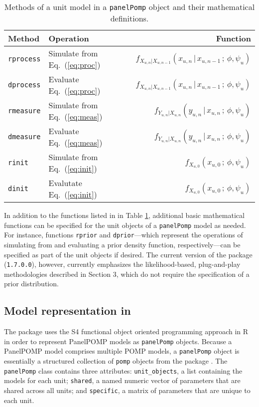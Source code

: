 \begin{table}[ht]
\begin{center}
\begin{tabular}{llr}\hline
Method            & Operation & Function\\\hline
\texttt{rprocess} & Simulate from Eq.~(\ref{eq:proc}) & $f_{X_{u,n}\vert X_{u,n-1}}(x_{u,n}\,|\, x_{u,n-1} \,;\, \phi,\psi_u)$\\
\texttt{dprocess} & Evaluate Eq.~(\ref{eq:proc}) & $f_{X_{u,n}\vert X_{u,n-1}}(x_{u,n}\,|\, x_{u,n-1} \,;\, \phi,\psi_u)$\\
\texttt{rmeasure} & Simulate from Eq.~(\ref{eq:meas}) & $f_{Y_{u,n}|X_{u,n}}(y_{u,n}\,|\, x_{u,n} \,;\, \phi,\psi_u)$\\
\texttt{dmeasure} & Evaluate Eq.~(\ref{eq:meas}) & $f_{Y_{u,n}|X_{u,n}}(y_{u,n}\,|\, x_{u,n} \,;\, \phi,\psi_u)$\\
\texttt{rinit}   & Simulate from Eq.~(\ref{eq:init}) & $f_{X_{u,0}}(x_{u,0} \,;\, \phi,\psi_u)$\\
\texttt{dinit}   & Evalutate Eq.~(\ref{eq:init}) & $f_{X_{u,0}}(x_{u,0} \,;\, \phi,\psi_u)$\\\hline
\end{tabular}
\end{center}
\caption{\label{tab:funs}Methods of a unit model in a \texttt{panelPomp} object and their mathematical definitions.}
\end{table}

In addition to the functions listed in in Table \ref{tab:funs}, additional basic mathematical functions can be specified for the unit objects of a \texttt{panelPomp} model as needed.
For instance, functions \texttt{rprior} and \texttt{dprior}---which represent the operations of simulating from and evaluating a prior density function, respectively---can be specified as part of the unit objects if desired.
The current version of the package (\texttt{1.7.0.0}), however, currently emphasizes the likelihood-based, plug-and-play methodologies described in Section 3, which do not require the specification of a prior distribution.

\subsection{\texorpdfstring{Model representation in }{Model representation in }}\label{model-representation-in}

The package uses the S4 functional object oriented programming approach in R \citep{wickham19} in order to represent PanelPOMP models as \texttt{panelPomp} objects.
Because a PanelPOMP model comprises multiple POMP models, a \texttt{panelPomp} object is essentially a structured collection of \texttt{pomp} objects from the  package \citep{king16}.
The \texttt{panelPomp} class contains three attributes: \texttt{unit\_objects}, a list containing the models for each unit; \texttt{shared}, a named numeric vector of parameters that are shared across all units; and \texttt{specific}, a matrix of parameters that are unique to each unit.

